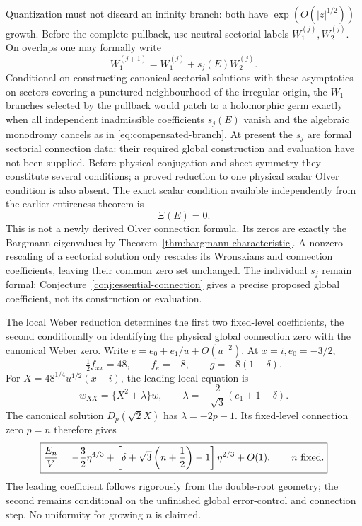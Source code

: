 \documentclass[11pt]{article}
\theoremstyle{remark}
\begin{document}
Quantization must not discard an infinity branch: both have
\(\exp(O(|z|^{1/2}))\) growth.  Before the complete pullback, use neutral
sectorial labels \(W_1^{(j)},W_2^{(j)}\).  On overlaps one may formally write
\begin{equation}
 W_1^{(j+1)}=W_1^{(j)}+s_j(E)W_2^{(j)}.
 \label{eq:origin-stokes-multiplier}
\end{equation}
Conditional on constructing canonical sectorial solutions with these
asymptotics on sectors covering a punctured neighbourhood of the irregular
origin, the \(W_1\) branches selected by the pullback would patch to a
holomorphic germ exactly when
all independent inadmissible coefficients \(s_j(E)\) vanish and the algebraic
monodromy cancels as in \eqref{eq:compensated-branch}.  At present the
\(s_j\) are formal sectorial connection data: their required global
construction and evaluation have not been supplied.  Before physical
conjugation and sheet symmetry they constitute several conditions; a proved
reduction to one physical scalar Olver condition is also absent.  The exact
scalar condition available independently from the earlier entireness theorem
is
\begin{equation}
 \boxed{\Xi(E)=0.}
 \label{eq:strong-drive-exact-quantization}
\end{equation}
This is not a newly derived Olver connection formula.  Its zeros are exactly
the Bargmann eigenvalues by
Theorem~\ref{thm:bargmann-characteristic}.  A nonzero rescaling of a sectorial
solution only rescales its Wronskians and connection coefficients, leaving
their common zero set unchanged.  The individual \(s_j\) remain formal;
Conjecture~\ref{conj:essential-connection} gives a precise proposed global
coefficient, not its construction or evaluation.

The local Weber reduction determines the first two fixed-level coefficients,
the second conditionally on identifying the physical global connection zero
with the canonical Weber zero.  Write \(e=e_0+e_1/u+O(u^{-2})\).  At
\(x=i,e_0=-3/2\),
\begin{equation}
 \tfrac12f_{xx}=48,\qquad f_e=-8,\qquad g=-8(1-\delta).
\end{equation}
For \(X=48^{1/4}u^{1/2}(x-i)\), the leading local equation is
\begin{equation}
 w_{XX}=\{X^2+\lambda\}w,\qquad
 \lambda=-\frac{2}{\sqrt3}(e_1+1-\delta).
\end{equation}
The canonical solution \(D_p(\sqrt2X)\) has \(\lambda=-2p-1\).  Its
fixed-level connection zero \(p=n\) therefore gives
\begin{equation}
 \boxed{\frac{E_n}{V}=-\frac32\eta^{4/3}
 +\left[\delta+\sqrt3\left(n+\frac12\right)-1\right]\eta^{2/3}
 +O(1),\qquad n\ \hbox{fixed}.}
 \label{eq:strong-drive-energy}
\end{equation}
The leading coefficient follows rigorously from the double-root geometry;
the second remains conditional on the unfinished global error-control and
connection step.  No uniformity for growing \(n\) is claimed.
\end{document}
